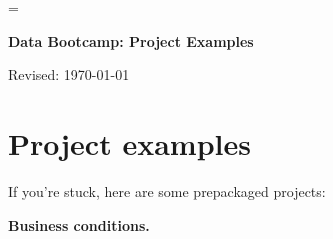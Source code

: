 \documentclass[11pt]{article}
\begin{document}
\parskip=\bigskipamount
\parindent=0.0in
\thispagestyle{empty}


\bigskip\bigskip
\centerline{\Large \bf Data Bootcamp:  Project Examples}
\centerline{Revised: \today}


\section*{Project examples}

If you're stuck, here are some prepackaged projects:  

{\bf Business conditions.\/} 









\end{document}
